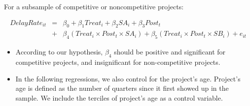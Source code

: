 \documentclass[
]{article}
\begin{document}
For a subsample of competitive or noncompetitive projects:

\[ \begin{aligned} DelayRate_{it} &=& \beta_0 +\beta_1 Treat_i+ \beta_2 SA_i+ \beta_3 Post_t \\&+& \beta_4 (Treat_i \times Post_t \times SA_i )+\beta_5 (Treat_i \times Post_t \times SB_i )+e_{it} \end{aligned} \]

\begin{itemize}
\item
  According to our hypothesis, \(\beta_4\) should be positive and
  significant for competitive projects, and insignificant for
  non-competitive projects.
\item
  In the following regressions, we also control for the project's age.
  Project's age is defined as the number of quarters since it first
  showed up in the sample. We include the terciles of project's age as a
  control variable.
\end{itemize}
\end{document}
